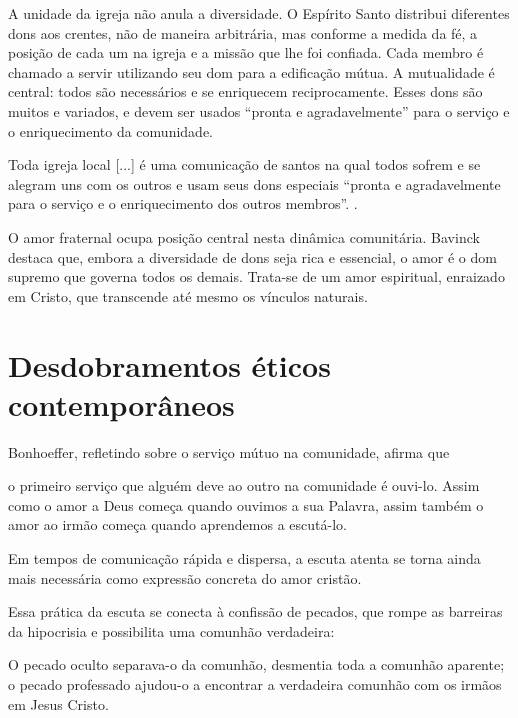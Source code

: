 A unidade da igreja não anula a diversidade. O Espírito Santo distribui diferentes dons aos crentes, não de maneira arbitrária, mas conforme a medida da fé, a posição de cada um na igreja e a missão que lhe foi confiada.\cite{bavinck2012} Cada membro é chamado a servir utilizando seu dom para a edificação mútua. A mutualidade é central: todos são necessários e se enriquecem reciprocamente. Esses dons são muitos e variados, e devem ser usados ``pronta e agradavelmente'' para o serviço e o enriquecimento da comunidade.\cite{bavinck2012}

\begin{citacao}
    Toda igreja local [...] é uma comunicação de santos na qual todos sofrem e se alegram uns com os outros e usam seus dons especiais ``pronta e agradavelmente para o serviço e o enriquecimento dos outros membros''. \cite[p.~380]{bavinck2012}.
\end{citacao}

O amor fraternal ocupa posição central nesta dinâmica comunitária. Bavinck destaca que, embora a diversidade de dons seja rica e essencial, o amor é o dom supremo que governa todos os demais\cite[p.~304]{bavinck2012}. Trata-se de um amor espiritual, enraizado em Cristo, que transcende até mesmo os vínculos naturais.\cite[p.~304]{bavinck2012}

\section{Desdobramentos éticos contemporâneos}

Bonhoeffer, refletindo sobre o serviço mútuo na comunidade, afirma que

\begin{citacao}
    o primeiro serviço que alguém deve ao outro na comunidade é ouvi-lo. Assim como o amor a Deus começa quando ouvimos a sua Palavra, assim também o amor ao irmão começa quando aprendemos a escutá-lo. \cite[pp.~75--76]{bonhoeffer1997}
\end{citacao}

Em tempos de comunicação rápida e dispersa, a escuta atenta se torna ainda mais necessária como expressão concreta do amor cristão.

Essa prática da escuta se conecta à confissão de pecados, que rompe as barreiras da hipocrisia e possibilita uma comunhão verdadeira:

\begin{citacao}
    O pecado oculto separava-o da comunhão, desmentia toda a comunhão aparente; o pecado professado ajudou-o a encontrar a verdadeira comunhão com os irmãos em Jesus Cristo. \cite[p.~88]{bonhoeffer1997}
\end{citacao}


